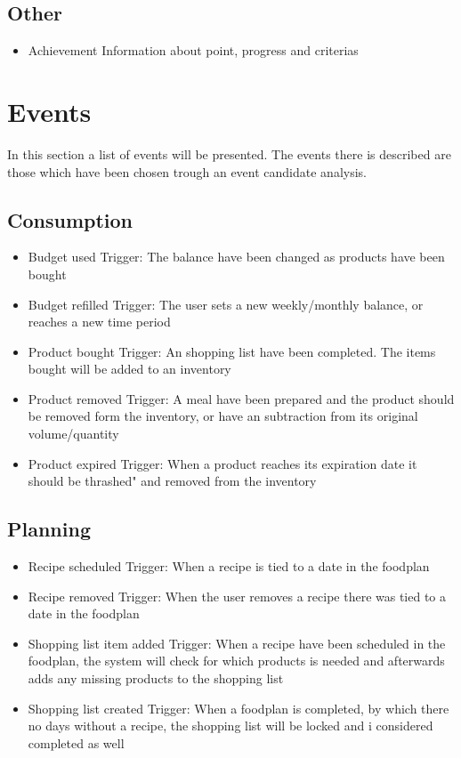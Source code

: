 \subsection{Other}
\begin{itemize}
\item Achievement
	\subitem Information about point, progress and criterias %
\end{itemize}

\section{Events}
In this section a list of events will be presented. The events there is described are those which have been chosen trough an event candidate analysis.
\subsection{Consumption}
\begin{itemize}
\item Budget used
	\subitem Trigger: The balance have been changed as products have been bought
\item Budget refilled
	\subitem Trigger: The user sets a new weekly/monthly balance, or reaches a new time period 
\item Product bought
	\subitem Trigger: An shopping list have been completed. The items bought will be added to an inventory
\item Product removed
	\subitem Trigger: A meal have been prepared and the product should be removed form the inventory, or have an subtraction from its original volume/quantity
\item Product expired
	\subitem Trigger: When a product reaches its expiration date it should be thrashed" and removed from the inventory
\end{itemize}

\subsection{Planning}
\begin{itemize}
\item Recipe scheduled
	\subitem Trigger: When a recipe is tied to a date in the foodplan
\item Recipe removed
	\subitem Trigger: When the user removes a recipe there was tied to a date in the foodplan
\item Shopping list item added
	\subitem Trigger: When a recipe have been scheduled in the foodplan, the system will check for which products is needed and afterwards adds any missing products to the shopping list
\item Shopping list created
	\subitem Trigger: When a foodplan is completed, by which there no days without a recipe, the shopping list will be locked and i considered completed as well
\end{itemize}

